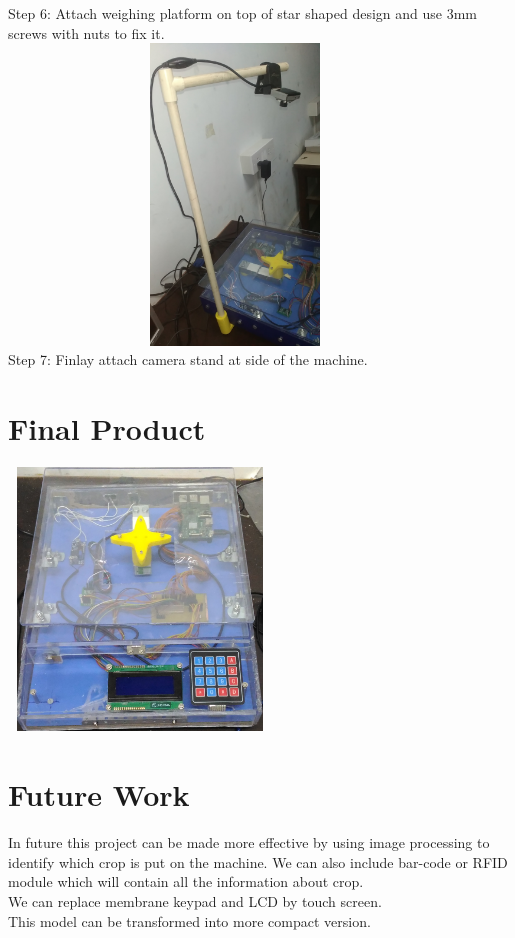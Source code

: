 \documentclass[a4paper,12pt,oneside]{book}
\begin{document}
Step 6: Attach weighing platform on top of star shaped design and use 3mm screws with nuts to fix it.\\
\includegraphics[height=8cm,width=12cm]{7.jpg}\\
Step 7: Finlay attach camera stand at side of the machine.\\



\section{Final Product}
\includegraphics[width=7cm, height=7cm]{wm.jpg}

\section{Future Work}
In future this project can be made more effective by using image processing to identify which crop is put on the machine. We can also include bar-code or RFID module which will contain all the information about crop.\\
We can replace membrane keypad and LCD by touch screen.\\
This model can be transformed into more compact version.\\
\end{document}
